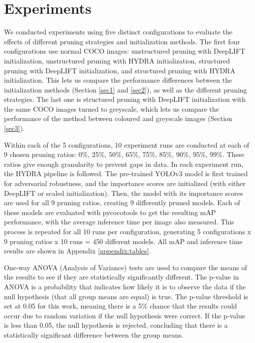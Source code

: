\documentclass[journal,onecolumn,12pt]{IEEEtran}
\begin{document}
\section{Experiments}

We conducted experiments using five distinct configurations to evaluate the effects of different pruning strategies and initialization methods. The first four configurations use normal COCO images: unstructured pruning with DeepLIFT initialization, unstructured pruning with HYDRA initialization, structured pruning with DeepLIFT initialization, and structured pruning with HYDRA initialization. This lets us compare the performance differences between the initialization methods (Section \ref{sec1} and \ref{sec2}), as well as the different pruning strategies. The last one is structured pruning with DeepLIFT initialization with the same COCO images turned to greyscale, which lets us compare the performance of the method between coloured and greyscale images (Section \ref{sec3}).

Within each of the 5 configurations, 10 experiment runs are conducted at each of 9 chosen pruning ratios: 0\%, 25\%, 50\%, 65\%, 75\%, 85\%, 90\%, 95\%, 99\%. These ratios give enough granularity to prevent gaps in data. In each experiment run, the HYDRA pipeline is followed. The pre-trained YOLOv3 model is first trained for adversarial robustness, and the importance scores are initialized (with either DeepLIFT or scaled initialization). Then, the model with its importance scores are used for all 9 pruning ratios, creating 9 differently pruned models. Each of these models are evaluated with pycocotools to get the resulting mAP performance, with the average inference time per image also measured. This process is repeated for all 10 runs per configuration, generating 5 configurations x 9 pruning ratios x 10 runs = 450 different models. All mAP and inference time results are shown in Appendix \ref{appendix:tables}.

One-way ANOVA (Analysis of Variance) tests are used to compare the means of the results to see if they are statistically significantly different. The p-value in ANOVA is a probability that indicates how likely it is to observe the data if the null hypothesis (that all group means are equal) is true. The p-value threshold is set at 0.05 for this work, meaning there is a 5\% chance that the results could occur due to random variation if the null hypothesis were correct. If the p-value is less than 0.05, the null hypothesis is rejected, concluding that there is a statistically significant difference between the group means.
\end{document}
